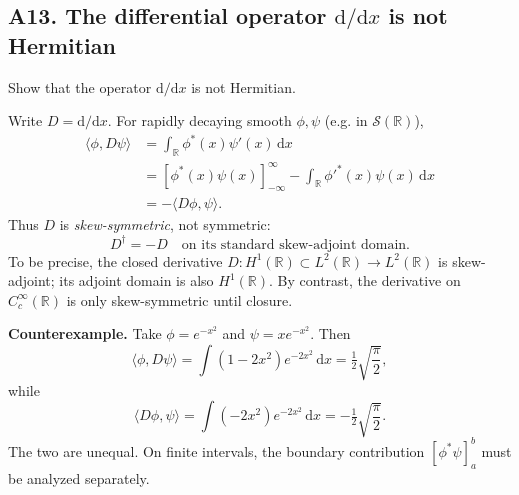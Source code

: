 \documentclass[11pt,a4paper]{article}
\newcommand{\dd}{\mathrm{d}}
\newcommand{\R}{\mathbb R}
\newcommand{\half}{\tfrac12}
\begin{document}
\subsection{A13. The differential operator $\dd/\dd x$ is not Hermitian}
\begin{questionbox}Show that the operator $\dd/\dd x$ is not Hermitian.\end{questionbox}
Write $D=\dd/\dd x$. For rapidly decaying smooth $\phi,\psi$ (e.g. in $\mathcal S(\R)$),
\begin{align}
\langle\phi,D\psi\rangle
&=\int_{\R}\phi^*(x)\psi'(x)\,\dd x\\
&=\left[\phi^*(x)\psi(x)\right]_{-\infty}^{\infty}
-\int_{\R}\phi'^*(x)\psi(x)\,\dd x\\
&= -\langle D\phi,\psi\rangle.
\end{align}
Thus $D$ is \emph{skew-symmetric}, not symmetric:
\begin{equation}\boxed{D^\dagger=-D\quad\text{on its standard skew-adjoint domain}}.
\end{equation}
To be precise, the closed derivative $D:H^1(\R)\subset L^2(\R)\to L^2(\R)$ is skew-adjoint; its adjoint domain is also $H^1(\R)$. By contrast, the derivative on $C_c^\infty(\R)$ is only skew-symmetric until closure.\par
\textbf{Counterexample.} Take $\phi=e^{-x^2}$ and $\psi=xe^{-x^2}$. Then
\begin{equation}
\langle\phi,D\psi\rangle=\int(1-2x^2)e^{-2x^2}\,\dd x=\half\sqrt{\frac\pi2},
\end{equation}
while
\begin{equation}
\langle D\phi,\psi\rangle=\int(-2x^2)e^{-2x^2}\,\dd x=-\half\sqrt{\frac\pi2}.
\end{equation}
The two are unequal. On finite intervals, the boundary contribution $[\phi^*\psi]_a^b$ must be analyzed separately.
\end{document}
